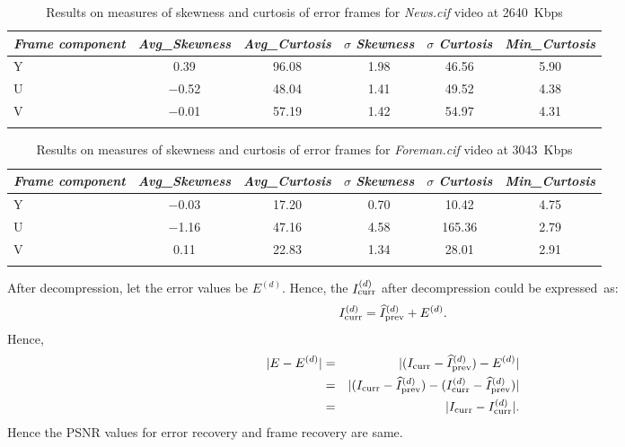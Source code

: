 \documentclass{doublecol-new}
\theoremstyle{TH}{
\newtheorem{lemma}{Lemma}[section]
\newtheorem{theorem}{Theorem}
\newtheorem{corrolary}{Corrolary}
\newtheorem{conjecture}[lemma]{Conjecture}
\newtheorem{proposition}[lemma]{Proposition}
\newtheorem{claim}[lemma]{Claim}
\newtheorem{stheorem}[lemma]{Wrong Theorem}
}
\theoremstyle{THrm}{
\newtheorem{definition}{Definition}[section]
\newtheorem{question}{Question}[section]
\newtheorem{remark}{Remark}[section]
\newtheorem{scheme}{Scheme}
}
\theoremstyle{THhit}{
\newtheorem{case}{Case}[section]
}
\begin{document}
\begin{table*}[!t]%
\caption{Results on measures of skewness and curtosis of error frames for {\it
News.cif} video at 2640~Kbps}\label{curtnews}
{\NINE\begin{tabular*}{\textwidth}{@{\extracolsep{\fill}}lccccc@{}} \toprule
{\it Frame component} & {\it Avg\_Skewness} & {\it Avg\_Curtosis} & $\sigma$
{\it Skewness} & $\sigma$ {\it Curtosis} & {\it Min\_Curtosis}\\ \midrule Y &
\p{$-$}0.39 & 96.08 & 1.98  & 46.56 & 5.90\\ U & $-$0.52 & 48.04  & 1.41 & 49.52
& 4.38\\
 V & $-$0.01 & 57.19  & 1.42 & 54.97 & 4.31\\
\botrule
\end{tabular*}}{}
\end{table*}

\begin{table*}[!t]%
\caption{Results on measures of skewness and curtosis of error frames for {\it
Foreman.cif} video at 3043~Kbps}\label{curtforeman}
{\NINE\begin{tabular*}{\textwidth}{@{\extracolsep{\fill}}lccccc@{}} \toprule
{\it Frame component} & {\it Avg\_Skewness} & {\it Avg\_Curtosis} & $\sigma$
{\it Skewness} & $\sigma$ {\it Curtosis} & {\it Min\_Curtosis}\\ \midrule Y &
$-$0.03 & 17.20 & 0.70  & 10.42 & 4.75\\
 U & $-$1.16 & 47.16  & 4.58  &165.36\p{0} & 2.79\\
V & \p{$-$}0.11 & 22.83  & 1.34  & 28.01 & 2.91\\ \botrule
\end{tabular*}}{}
\end{table*}

\noindent After decompression, let the error values be $E^{(d)}$. Hence,
the $I_{\rm curr}^{(d)}$ after decompression could be expressed~as:
\begin{equation}
I_{\rm curr}^{(d)}=\widehat{I}_{\rm prev}^{(d)}+E^{(d)}.
\end{equation}
Hence,
\begin{eqnarray}
|E-E^{(d)}| & = & |(I_{\rm curr}-\widehat{I}_{\rm
prev}^{(d)})-E^{(d)}|\nonumber\\
 &=& |(I_{\rm curr}-\widehat{I}_{\rm prev}^{(d)})-(I_{\rm curr}^{(d)}-\widehat{I}_{\rm prev}^{(d)})|\nonumber\\
  &=&  |I_{\rm curr}-I_{\rm curr}^{(d)}|.
\end{eqnarray}
Hence the PSNR values for error recovery and frame recovery are same.
\endproof
\end{document}
